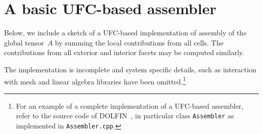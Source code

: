 \chapter{A basic UFC-based assembler}
\label{app:assembly}

Below, we include a sketch of a UFC-based implementation of assembly
of the global tensor~$A$ by summing the local contributions from all
cells. The contributions from all exterior and interior facets may be
computed similarly.

 The implementation is incomplete and system specific details, such as
interaction with mesh and linear algebra libraries have been
omitted.\footnote{For an example of a complete implementation of a
UFC-based assembler, refer to the source code of
DOLFIN~\cite{www:dolfin}, in particular class \texttt{Assembler} as
implemented in \texttt{Assembler.cpp}.}

